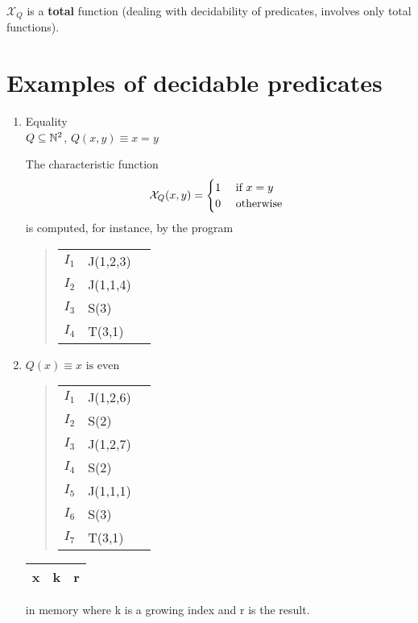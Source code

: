 \begin{remark}
    $\mathcal{X}_Q$ is a \textbf{total} function (dealing with decidability of predicates, involves only total functions).
\end{remark}


\section {Examples of decidable predicates}
\begin{enumerate}
    \item Equality\\
    $ Q \subseteq \mathbb{N}^2 $, $ Q(x,y) \equiv x = y $

    The characteristic function
    \begin{equation*}
    \mathcal{X}_Q(x,y) = \begin{cases}
    1 & $ if $ x = y  \\
    0 & $ otherwise $
    \end{cases}
    \end{equation*}
    is computed, for instance, by the program
    \begin{quote}
    \begin{tabular}{lll}
    $I_1$ & J(1,2,3)  \\
    $I_2$ & J(1,1,4)       \\
    $I_3$ & S(3) \\
    $I_4$ & T(3,1)
    \end{tabular}
    \end{quote}

    \item $ Q(x) \equiv x \text{ is even} $

    \begin{quote}
    \begin{tabular}{lll}
    $I_1$ & J(1,2,6)   \\
    $I_2$ & S(2)        \\
    $I_3$ & J(1,2,7)   \\
    $I_4$ & S(2)        \\
    $I_5$ & J(1,1,1) \\
    $I_6$ & S(3)        \\
    $I_7$ & T(3,1)
    \end{tabular}
    \end{quote}
    
    \begin{tabu}{|c|c|c|}
    \hline
    x & k & r \\
    \hline
    \end{tabu} in memory where k is a growing index and r is the result.
    

\end{enumerate}
